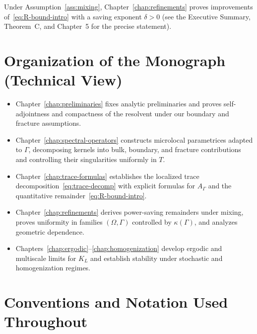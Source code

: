 Under Assumption~\ref{ass:mixing}, Chapter~\ref{chap:refinements} proves
improvements of~\eqref{eq:R-bound-intro} with a saving exponent $\delta>0$
(see the Executive Summary, Theorem~C, and Chapter~5 for the precise statement).

\section{Organization of the Monograph (Technical View)}
\label{sec:intro-organization}

\begin{itemize}
  \item Chapter~\ref{chap:preliminaries} fixes analytic preliminaries and proves
  self-adjointness and compactness of the resolvent under our boundary and
  fracture assumptions.

  \item Chapter~\ref{chap:spectral-operators} constructs microlocal parametrices
  adapted to $\Gamma$, decomposing kernels into bulk, boundary, and fracture
  contributions and controlling their singularities uniformly in $T$.

  \item Chapter~\ref{chap:trace-formulas} establishes the localized trace
  decomposition~\eqref{eq:trace-decomp} with explicit formulas for
  $A_{\Gamma}$ and the quantitative remainder~\eqref{eq:R-bound-intro}.

  \item Chapter~\ref{chap:refinements} derives power-saving remainders under
  mixing, proves uniformity in families $(\Omega,\Gamma)$ controlled by
  $\kappa(\Gamma)$, and analyzes geometric dependence.

  \item Chapters~\ref{chap:ergodic}–\ref{chap:homogenization} develop ergodic
  and multiscale limits for $K_L$ and establish stability under stochastic and
  homogenization regimes.
\end{itemize}

\section{Conventions and Notation Used Throughout}
\label{sec:intro-notation}

